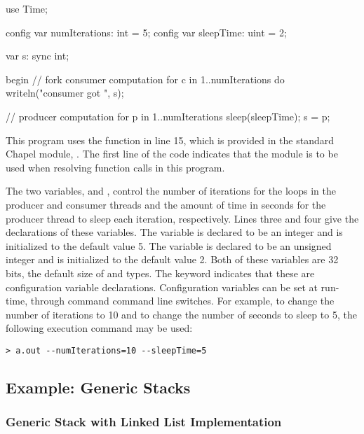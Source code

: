 \begin{numberedchapel}
use Time;

config var numIterations: int = 5;
config var sleepTime: uint = 2;

var s: sync int;

begin {  // fork consumer computation
  for c in 1..numIterations do
    writeln("consumer got ", s);
}

// producer computation
for p in 1..numIterations {
  sleep(sleepTime);
  s = p;
}
\end{numberedchapel}

This program uses the  function in line 15, which is provided in the
standard Chapel module, .  The first line of the code  
indicates that the  module is to be used when resolving function calls in 
this program.  

The two variables,  and , control
the number of iterations for the loops in the producer and consumer threads
and the amount of time in seconds for the producer thread to sleep each iteration,
respectively.  Lines three and four give the declarations of these variables.
The variable  is declared to be an integer and is initialized
to the default value 5.  The variable  is declared to be an 
unsigned integer and is initialized to the default value 2.  
Both of these variables are 32 bits, the default size of  and  types.
The  keyword indicates that these are configuration variable 
declarations.  Configuration variables can be set at run-time, through command 
command line switches.  For example, to change the number of iterations to 10
and to change the number of seconds to sleep to 5, the following execution command 
may be used:
\begin{verbatim}
> a.out --numIterations=10 --sleepTime=5
\end{verbatim}

\subsection{Example: Generic Stacks}

\subsubsection{Generic Stack with Linked List Implementation}


